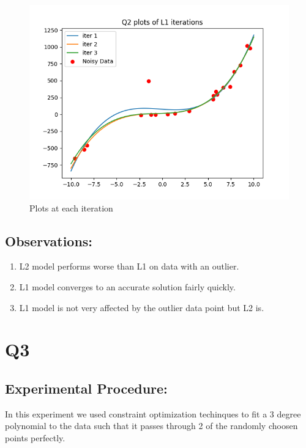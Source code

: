 \documentclass{article}
\begin{document}
\begin{enumerate}
\begin{figure}[h]
            \includegraphics[width = 15 cm]{figs/L1iterplot.png}
        \caption{Plots at each iteration}
    \end{figure}
\clearpage
\end{enumerate}

\subsection{Observations:}
\begin{enumerate}
    \item L2 model performs worse than L1 on data with an outlier.
    \item L1 model converges to an accurate solution fairly quickly.
    \item L1 model is not very affected by the outlier data point but L2 is.
\end{enumerate}

\section{Q3}
\subsection{Experimental Procedure:}
In this experiment we used constraint optimization techinques to fit a 3 degree polynomial to the data such that it passes through 2 of the randomly choosen points perfectly.\\
\end{document}
